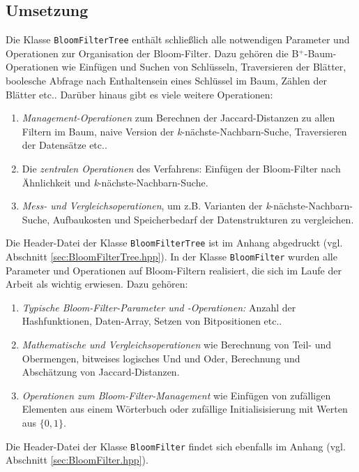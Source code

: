 \subsection{Umsetzung}\label{sec:umsetzung}
Die Klasse \texttt{BloomFilterTree} enthält schließlich alle notwendigen Parameter und Operationen zur Organisation der Bloom-Filter. Dazu gehören die B$^+$-Baum-Operationen wie Einfügen und Suchen von Schlüsseln, Traversieren der Blätter, boolesche Abfrage nach Enthaltensein eines Schlüssel im Baum, Zählen der Blätter etc.. Darüber hinaus gibt es viele weitere Operationen: 
\begin{enumerate}
	\item \textit{Management-Operationen} zum Berechnen der Jaccard-Distanzen zu allen Filtern im Baum, naive Version der \textit{k}-nächste-Nachbarn-Suche, Traversieren der Datensätze etc..
	\item Die \textit{zentralen Operationen} des Verfahrens: Einfügen der Bloom-Filter nach Ähnlichkeit und \textit{k}-nächste-Nachbarn-Suche. 
	\item \textit{Mess- und Vergleichsoperationen}, um z.B. Varianten der \textit{k}-nächste-Nachbarn-Suche, Aufbaukosten und Speicherbedarf der Datenstrukturen zu vergleichen. 
\end{enumerate}
Die Header-Datei der Klasse \texttt{BloomFilterTree} ist im Anhang abgedruckt (vgl. Abschnitt \ref{sec:BloomFilterTree.hpp}). In der Klasse \texttt{BloomFilter} wurden alle Parameter und Operationen auf Bloom-Filtern realisiert, die sich im Laufe der Arbeit als wichtig erwiesen. Dazu gehören: 
\begin{enumerate}
	\item \textit{Typische Bloom-Filter-Parameter und -Operationen:} Anzahl der Hashfunktionen, Daten-Array, Setzen von Bitpositionen etc..
	\item \textit{Mathematische und Vergleichsoperationen} wie Berechnung von Teil- und Obermengen, bitweises logisches Und und Oder, Berechnung und Abschätzung von Jaccard-Distanzen.
	\item \textit{Operationen zum Bloom-Filter-Management} wie Einfügen von zufälligen Elementen aus einem Wörterbuch oder zufällige Initialisisierung mit Werten aus $\{0,1\}$.
\end{enumerate}
Die Header-Datei der Klasse \texttt{BloomFilter} findet sich ebenfalls im Anhang (vgl. Abschnitt \ref{sec:BloomFilter.hpp}).
